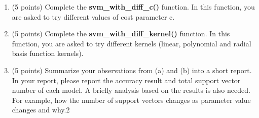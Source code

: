 \documentclass[11pt]{article}
\begin{document}
\begin{enumerate}
\begin{enumerate}
\item (5 points) Complete the \textbf{svm\_with\_diff\_c()}
function. In this function, you are asked to try different values
of cost parameter c.
\item (5 points) Complete the \textbf{svm\_with\_diff\_kernel()}
function. In this function, you are asked to try different
kernels (linear, polynomial and radial basis function kernels).
\item (5 points) Summarize your observations from (a) and (b)
into a short report. In your report, please report the accuracy
result and total support vector number of each model. A briefly
analysis based on the results is also needed. For example, how
the number of support vectors changes as parameter value changes
and why.2
\end{enumerate}


\end{enumerate}
\end{document}
